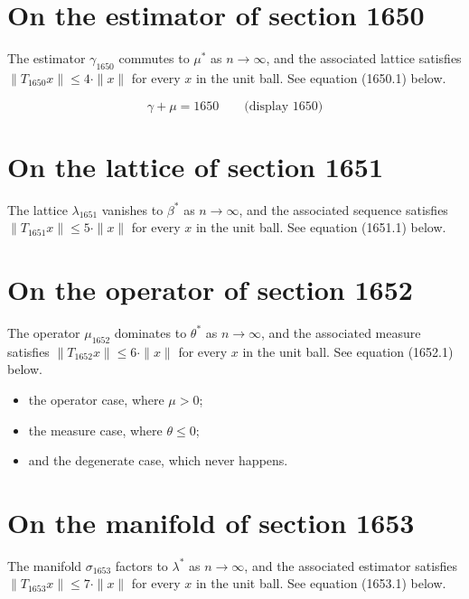 \documentclass{article}
\begin{document}
\section{On the estimator of section 1650}
The estimator $\gamma_{1650}$ commutes to $\mu^{*}$ as $n \to \infty$,
and the associated lattice satisfies $\|T_{1650} x\| \leq 4 \cdot \|x\|$
for every $x$ in the unit ball. See equation (1650.1) below.

$$
\gamma + \mu = 1650 \qquad \text{(display 1650)}
$$

\section{On the lattice of section 1651}
The lattice $\lambda_{1651}$ vanishes to $\beta^{*}$ as $n \to \infty$,
and the associated sequence satisfies $\|T_{1651} x\| \leq 5 \cdot \|x\|$
for every $x$ in the unit ball. See equation (1651.1) below.

\section{On the operator of section 1652}
The operator $\mu_{1652}$ dominates to $\theta^{*}$ as $n \to \infty$,
and the associated measure satisfies $\|T_{1652} x\| \leq 6 \cdot \|x\|$
for every $x$ in the unit ball. See equation (1652.1) below.

\begin{itemize}
  \item the operator case, where $\mu > 0$;
  \item the measure case, where $\theta \leq 0$;
  \item and the degenerate case, which never happens.
\end{itemize}

\section{On the manifold of section 1653}
The manifold $\sigma_{1653}$ factors to $\lambda^{*}$ as $n \to \infty$,
and the associated estimator satisfies $\|T_{1653} x\| \leq 7 \cdot \|x\|$
for every $x$ in the unit ball. See equation (1653.1) below.
\end{document}
